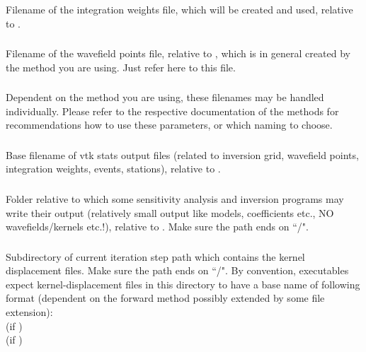 \subsubsection{} 
Filename of the integration weights file, which will be created and used, relative to 
. 
\subsubsection{} 
Filename of the wavefield points file, relative to , which
is in general created by the method you are using. Just refer here to this file. 
\subsubsection{} \label{files,sec:iter_parfile,itm:model}
Dependent on the method you are using, these filenames may be handled individually. Please refer to the respective 
documentation of the methods for recommendations how to use these parameters, or which naming to choose.
\subsubsection{}
Base filename of vtk stats output files (related to inversion grid, wavefield points, integration weights,
events, stations), relative to . 
\subsubsection{}
Folder relative to which some sensitivity analysis and inversion programs may write their output (relatively small output
like models, coefficients etc., NO wavefields/kernels etc.!), relative to 
.  Make sure the path ends on ``/".
\subsubsection{} 
Subdirectory of current iteration step path
 which contains the 
kernel displacement files. Make sure the path ends on ``/".
By convention, \ASKI{} executables expect kernel-displacement files in this directory to have a base name 
of following format (dependent on the forward method possibly extended by some file extension):\\
 (if )\\
 (if )
